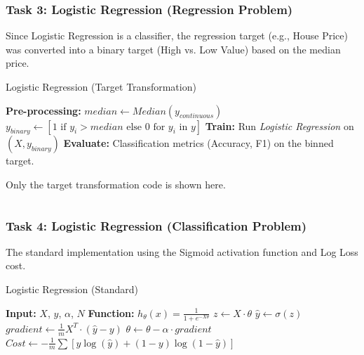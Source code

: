 \documentclass[11pt]{article}
\begin{document}
\subsubsection{Task 3: Logistic Regression (Regression Problem)}
Since Logistic Regression is a classifier, the regression target (e.g., House Price) was converted into a binary target (High vs. Low Value) based on the median price.

\begin{algorithm}[H]
    \caption{Logistic Regression (Target Transformation)}
    \begin{algorithmic}[1]
        \State \textbf{Pre-processing:}
        \State $median \gets Median(y_{continuous})$
        \State $y_{binary} \gets [1 \text{ if } y_i > median \text{ else } 0 \text{ for } y_i \text{ in } y]$
        \State \textbf{Train:} Run \textit{Logistic Regression} on $(X, y_{binary})$
        \State \textbf{Evaluate:} Classification metrics (Accuracy, F1) on the binned target.
    \end{algorithmic}
\end{algorithm}

\begin{multicols}{2}
    Only the target transformation code is shown here.
    \inputminted{python}{assets/3_logReg_reg.py}
\end{multicols}

\subsubsection{Task 4: Logistic Regression (Classification Problem)}
The standard implementation using the Sigmoid activation function and Log Loss cost.

\begin{algorithm}[H]
    \caption{Logistic Regression (Standard)}
    \begin{algorithmic}[1]
        \State \textbf{Input:} $X$, $y$, $\alpha$, $N$
        \State \textbf{Function:} $h_\theta(x) = \frac{1}{1 + e^{-X\theta}}$
        \State $z \gets X \cdot \theta$
        \State $\hat{y} \gets \sigma(z)$ 
        \State $gradient \gets \frac{1}{m} X^T \cdot (\hat{y} - y)$
        \State $\theta \gets \theta - \alpha \cdot gradient$
        \State $Cost \gets -\frac{1}{m} \sum [y \log(\hat{y}) + (1-y) \log(1-\hat{y})]$
        \EndFor
    \end{algorithmic}
\end{algorithm}
\end{document}
